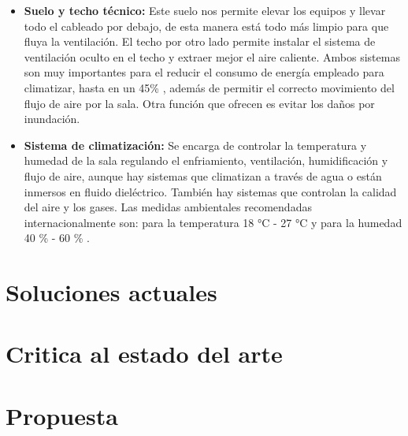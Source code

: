 \begin{itemize}
	\item \textbf{Suelo y techo técnico:} Este suelo nos permite elevar los equipos y llevar todo el cableado por debajo, de esta manera está todo más limpio para que fluya la ventilación. El techo por otro lado permite instalar el sistema de ventilación oculto en el techo y extraer mejor el aire caliente. Ambos sistemas son muy importantes para el reducir el consumo de energía empleado para climatizar, hasta en un 45\% \cite{noauthor_suelo_2020}, además de permitir el correcto movimiento del flujo de aire por la sala. Otra función que ofrecen es evitar los daños por inundación.
	\item \textbf{Sistema de climatización:} Se encarga de controlar la temperatura y humedad de la sala regulando el enfriamiento, ventilación, humidificación y flujo de aire, aunque hay sistemas que climatizan a través de agua o están inmersos en fluido dieléctrico. También hay sistemas que controlan la calidad del aire y los gases. Las medidas ambientales recomendadas internacionalmente son: para la temperatura 18 °C - 27 °C y para la humedad 40 \% - 60 \% \cite{noauthor_recommended_nodate}.
\end{itemize}

\section{Soluciones actuales}

\section{Critica al estado del arte}

\section{Propuesta}